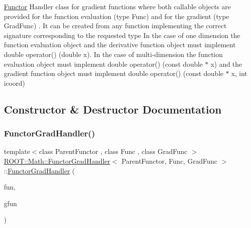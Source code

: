 \mbox{\hyperlink{classROOT_1_1Math_1_1Functor}{Functor}} Handler class for gradient functions where both callable objects are provided for the function evaluation (type Func) and for the gradient (type Grad\+Func) . It can be created from any function implementing the correct signature corresponding to the requested type In the case of one dimension the function evaluation object and the derivative function object must implement double operator() (double x). In the case of multi-\/dimension the function evaluation object must implement double operator() (const double $\ast$ x) and the gradient function object must implement double operator() (const double $\ast$ x, int icoord) 

\subsection{Constructor \& Destructor Documentation}
\mbox{\label{classROOT_1_1Math_1_1FunctorGradHandler_a139441c0174a37b1385732b0f7602ad7}} 
\subsubsection{\texorpdfstring{FunctorGradHandler()}{FunctorGradHandler()}\hspace{0.1cm}{\footnotesize\ttfamily [1/4]}}
{\footnotesize\ttfamily template$<$class Parent\+Functor , class Func , class Grad\+Func $>$ \\
\mbox{\hyperlink{classROOT_1_1Math_1_1FunctorGradHandler}{R\+O\+O\+T\+::\+Math\+::\+Functor\+Grad\+Handler}}$<$ Parent\+Functor, Func, Grad\+Func $>$\+::\mbox{\hyperlink{classROOT_1_1Math_1_1FunctorGradHandler}{Functor\+Grad\+Handler}} (\begin{DoxyParamCaption}\item[{const Func \&}]{fun,  }\item[{const Grad\+Func \&}]{gfun }\end{DoxyParamCaption})\hspace{0.3cm}{\ttfamily [inline]}}

